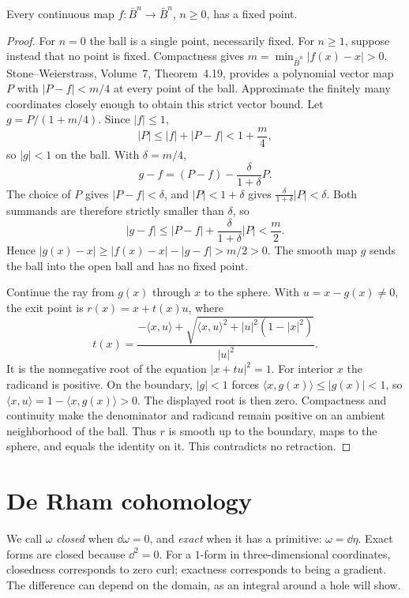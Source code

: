 \begin{theorem}[Brouwer]\label{thm:brouwern}
Every continuous map $f:\bar B^n\to\bar B^n$, $n\ge0$, has a fixed point.
\end{theorem}

\begin{proof}
For $n=0$ the ball is a single point, necessarily fixed. For $n\ge1$, suppose instead that no point is fixed. Compactness gives $m=\min_{\bar B^n}|f(x)-x|>0$. Stone--Weierstrass, Volume~7, Theorem~4.19, provides a polynomial vector map $P$ with $|P-f|<m/4$ at every point of the ball. Approximate the finitely many coordinates closely enough to obtain this strict vector bound. Let $g=P/(1+m/4)$. Since $|f|\le1$,
\[
|P|\le|f|+|P-f|<1+\frac m4,
\]
so $|g|<1$ on the ball. With $\delta=m/4$,
\[
g-f=(P-f)-\frac{\delta}{1+\delta}P.
\]
The choice of $P$ gives $|P-f|<\delta$, and $|P|<1+\delta$ gives $\frac{\delta}{1+\delta}|P|<\delta$. Both summands are therefore strictly smaller than $\delta$, so
\[
|g-f|\le|P-f|+\frac{\delta}{1+\delta}|P|<\frac m2.
\]
Hence $|g(x)-x|\ge|f(x)-x|-|g-f|>m/2>0$. The smooth map $g$ sends the ball into the open ball and has no fixed point.

Continue the ray from $g(x)$ through $x$ to the sphere. With $u=x-g(x)\ne0$, the exit point is $r(x)=x+t(x)u$, where
\[
t(x)=\frac{-\langle x,u\rangle+\sqrt{\langle x,u\rangle^2+|u|^2(1-|x|^2)}}{|u|^2}.
\]
It is the nonnegative root of the equation $|x+tu|^2=1$. For interior $x$ the radicand is positive. On the boundary, $|g|<1$ forces $\langle x,g(x)\rangle\le|g(x)|<1$, so $\langle x,u\rangle=1-\langle x,g(x)\rangle>0$. The displayed root is then zero. Compactness and continuity make the denominator and radicand remain positive on an ambient neighborhood of the ball. Thus $r$ is smooth up to the boundary, maps to the sphere, and equals the identity on it. This contradicts no retraction.
\end{proof}

\section{De Rham cohomology}

We call $\omega$ \emph{closed} when $\dd\omega=0$, and \emph{exact} when it has a primitive: $\omega=\dd\eta$. Exact forms are closed because $\dd^2=0$. For a $1$-form in three-dimensional coordinates, closedness corresponds to zero curl; exactness corresponds to being a gradient. The difference can depend on the domain, as an integral around a hole will show.

